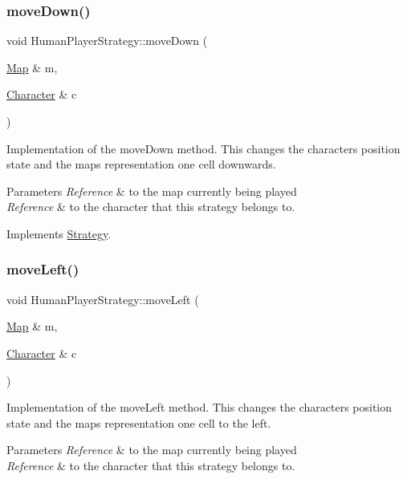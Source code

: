\subsubsection{\texorpdfstring{move\+Down()}{moveDown()}}
{\footnotesize\ttfamily void Human\+Player\+Strategy\+::move\+Down (\begin{DoxyParamCaption}\item[{\hyperlink{classMap}{Map} \&}]{m,  }\item[{\hyperlink{classCharacter}{Character} \&}]{c }\end{DoxyParamCaption})\hspace{0.3cm}{\ttfamily [virtual]}}

Implementation of the move\+Down method. This changes the character\textquotesingle{}s position state and the map\textquotesingle{}s representation one cell downwards. 
\begin{DoxyParams}{Parameters}
{\em Reference} & to the map currently being played \\
\hline
{\em Reference} & to the character that this strategy belongs to. \\
\hline
\end{DoxyParams}


Implements \hyperlink{classStrategy}{Strategy}.

\hypertarget{classHumanPlayerStrategy_af235285084801301c8cf1bb9743d6469}{}\label{classHumanPlayerStrategy_af235285084801301c8cf1bb9743d6469} 
\subsubsection{\texorpdfstring{move\+Left()}{moveLeft()}}
{\footnotesize\ttfamily void Human\+Player\+Strategy\+::move\+Left (\begin{DoxyParamCaption}\item[{\hyperlink{classMap}{Map} \&}]{m,  }\item[{\hyperlink{classCharacter}{Character} \&}]{c }\end{DoxyParamCaption})\hspace{0.3cm}{\ttfamily [virtual]}}

Implementation of the move\+Left method. This changes the character\textquotesingle{}s position state and the map\textquotesingle{}s representation one cell to the left. 
\begin{DoxyParams}{Parameters}
{\em Reference} & to the map currently being played \\
\hline
{\em Reference} & to the character that this strategy belongs to. \\
\hline
\end{DoxyParams}


